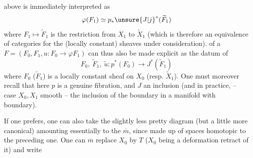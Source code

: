 %
above is immediately interpreted as
\[
\varphi(F_1)\simeq p_*{\unsure{J|j}}^*(\widetilde F_1)
\]
where $F_1\mapsto\widetilde F_1$ is the restriction from $X_1$ to $\widetilde X_1$ (which
is therefore an equivalence of categories for the
(locally constant) sheaves under consideration).  
of a $F=(F_0,F_1,u:F_0\to\varphi F_1)$ can thus also
be made explicit as the datum of
\[
F_0,\ \widetilde F_1,\ \widetilde u:p^*(F_0)\longrightarrow J^*(\widetilde F_1)
\]
where $F_0$ ($\widetilde F_1$) is a locally constant sheaf on
$X_0$ (resp. $\widetilde X_1$). One must moreover recall
that here $p$ is a genuine fibration, and $J$ an inclusion
(and in practice, -- case $X_0,X_1$ smooth --
 the inclusion of the boundary in a manifold
with boundary).

If one prefers, one can also take the
slightly less pretty diagram (but a
little more canonical)
amounting essentially to the $\overline m$, since made up of spaces
homotopic to the preceding one. One can $\overline m$ replace
$X_0$ by $T$ ($X_0$ being a deformation retract of it) and write
